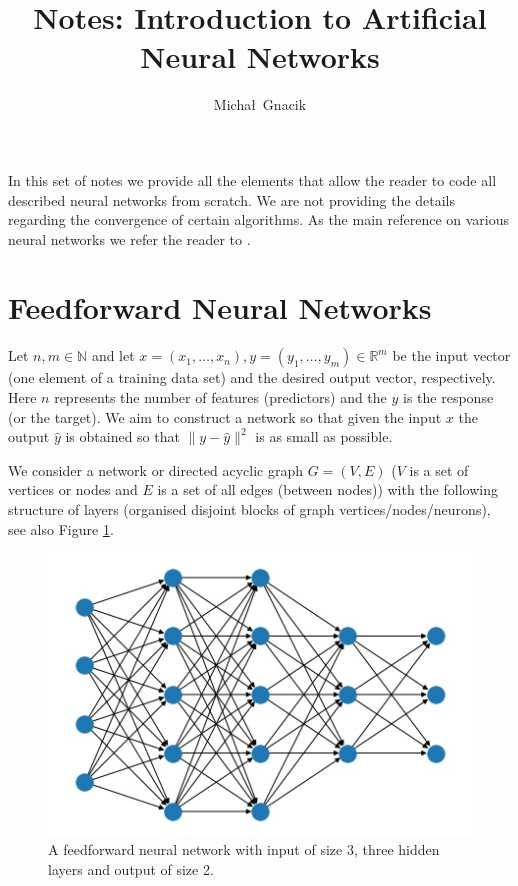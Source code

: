\documentclass[12pt]{amsart}
\author{Micha\l \ Gnacik}
\title[Intro to NN]{Notes: Introduction to Artificial Neural Networks
}
\theoremstyle{remark}
\theoremstyle{definition}
\numberwithin{equation}{section}
\begin{document}
\maketitle

In this set of notes we provide all the elements that allow the reader to code all described neural networks from scratch. We are not providing the details regarding the convergence of certain algorithms. As the main reference on various neural networks we refer the reader to \cite{bishop:2006:PRML}.

\section{Feedforward Neural Networks}
Let $n, m \in \mathbb{N}$ and let $x= (x_1, \ldots, x_n), y=(y_1, \ldots, y_m) \in \mathbb{R}^m$ be the input vector (one element of a training data set) and the desired output vector, respectively. Here $n$ represents the number of features (predictors) and the $y$ is the response (or the target). We aim to construct a network so that given the input $x$ the output $\widehat{y}$ is obtained 
so that $\| y - \widehat{y}\|^2$ is as small as possible.

\noindent  
We consider a network or directed acyclic graph $G = (V, E)$ ($V$ is a set of vertices or nodes and $E$ is a set of all edges (between nodes)) with the following structure of layers (organised disjoint blocks of graph vertices/nodes/neurons), see also Figure \ref{fig: nn}.  
\begin{figure}[h!]
	\centering
	\includegraphics[scale=0.5]{nn.jpg}
	\caption{A feedforward neural network with input of size 3, three hidden layers and output of size 2.}
	\label{fig: nn}
\end{figure}
 
\end{document}

